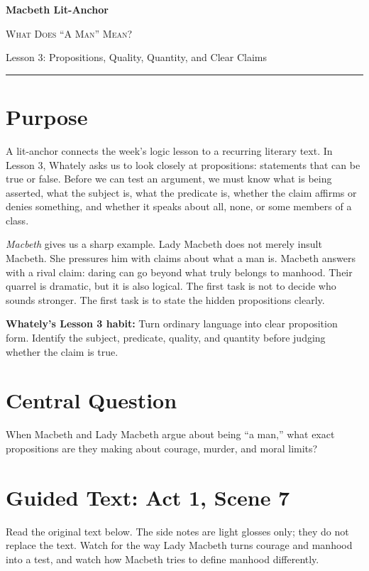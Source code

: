 \documentclass[12pt]{article}
\newcommand{\focusbox}[1]{\par\vspace{0.35em}\noindent\begingroup\setlength{\fboxsep}{6pt}\colorbox{gray!12}{\begin{minipage}{\dimexpr\linewidth-2\fboxsep\relax}#1\end{minipage}}\endgroup\par\vspace{0.45em}}
\begin{document}
\begin{center}
{\LARGE\bfseries Macbeth Lit-Anchor}\par\vspace{0.18em}
{\large\scshape What Does ``A Man'' Mean?}\par\vspace{0.35em}
{Lesson 3: Propositions, Quality, Quantity, and Clear Claims}\par\vspace{0.55em}
\rule{0.82\textwidth}{0.4pt}
\end{center}

\section*{Purpose}
A lit-anchor connects the week's logic lesson to a recurring literary text. In Lesson 3, Whately asks us to look closely at propositions: statements that can be true or false. Before we can test an argument, we must know what is being asserted, what the subject is, what the predicate is, whether the claim affirms or denies something, and whether it speaks about all, none, or some members of a class.

\textit{Macbeth} gives us a sharp example. Lady Macbeth does not merely insult Macbeth. She pressures him with claims about what a man is. Macbeth answers with a rival claim: daring can go beyond what truly belongs to manhood. Their quarrel is dramatic, but it is also logical. The first task is not to decide who sounds stronger. The first task is to state the hidden propositions clearly.

\focusbox{\textbf{Whately's Lesson 3 habit:} Turn ordinary language into clear proposition form. Identify the subject, predicate, quality, and quantity before judging whether the claim is true.}

\section*{Central Question}
When Macbeth and Lady Macbeth argue about being ``a man,'' what exact propositions are they making about courage, murder, and moral limits?

\section*{Guided Text: Act 1, Scene 7}
Read the original text below. The side notes are light glosses only; they do not replace the text. Watch for the way Lady Macbeth turns courage and manhood into a test, and watch how Macbeth tries to define manhood differently.
\end{document}
